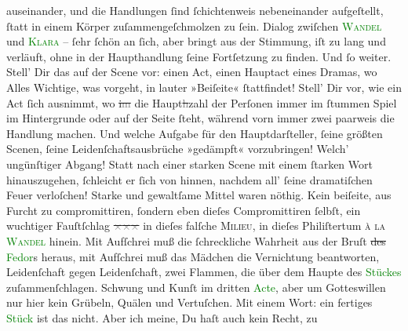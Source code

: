 \documentclass[twoside=false,titlepage=false,open=any, parskip=never, fontsize=12pt, headings=small, chapterprefix=false, appendixprefix=false]{scrbook}
\newcommand{\strikeout}[1]{\sout{#1}}
\newcommand{\pbposition}{\depth}
\newcommand{\pb}{\nobreak\hspace{0pt}\raisebox{-0.1em}{\raisebox{\pbposition}{\textnormal{|}}}\nobreak\hspace{0pt}}
\begin{document}
               auseinander, und die Handlungen ſind ſchichtenweis nebeneinander aufgeſtellt, ſtatt
               in einem Körper zuſammengeſchmolzen zu ſein. Dialog zwiſchen \textsc{\textcolor{green}{Wandel}{}} und \textsc{\textcolor{green}{Klara}{}} – ſehr ſchön an ſich, aber bringt aus der Stimmung, iſt zu lang und verläuft,
               ohne in der Haupthandlung ſeine Fortſetzung zu finden. Und ſo weiter. Stell’ Dir das
               auf der Scene vor: einen Act, einen Hauptact eines Dramas, wo Alles Wichtige, was
               vorgeht, in lauter »Beiſeite« ſtattfindet! Stell’ Dir vor, wie ein Act ſich ausnimmt,
               wo \strikeout{i\textcolor{gray}{m}} die Haupt\strikeout{\textcolor{gray}{h}}zahl der Perſonen immer im ſtummen Spiel im Hintergrunde oder auf der Seite
               ſteht, während vorn immer zwei paarweis {\pb}die
               Handlung machen. Und welche Aufgabe für den Hauptdarſteller, ſeine größten Scenen,
               ſeine Leidenſchaftsausbrüche »gedämpft« vorzubringen! Welch’ ungünſtiger Abgang!
               Statt nach einer starken Scene mit einem ſtarken Wort hinauszugehen, ſchleicht er
               ſich von hinnen, nachdem all’ ſeine dramatiſchen Feuer verloſchen! Starke und
               gewaltſame Mittel waren nöthig. Kein beiſeite, aus Furcht zu compromittiren, ſondern
               eben dieſes Compromittiren ſelbſt, ein wuchtiger Fauſtſchlag \strikeout{\textcolor{gray}{×}\-\textcolor{gray}{×}\-\textcolor{gray}{×}} in dieſes falſche \textsc{Milieu}, in dieſes Philiſtertum \textsc{à la \textcolor{green}{Wandel}{}} hinein. Mit Aufſchrei muß die ſchreckliche Wahrheit aus der Bruſt \strikeout{des}{ }\textcolor{green}{Fedor}{}s heraus, mit Aufſchrei
               muß das Mädchen die Vernichtung beantworten, Leidenſchaft gegen Leidenſchaft, zwei
               Flammen, die über dem Haupte des \textcolor{green}{Stückes}{} zuſammenſchlagen. Schwung und Kunſt im dritten \textcolor{green}{Acte}{}, aber {\pb}um Gotteswillen nur hier kein Grübeln, Quälen und Vertuſchen.\pend
           \pstart
           Mit einem Wort: ein fertiges \textcolor{green}{Stück}{} ist das nicht. Aber ich meine, Du haſt auch kein Recht, zu
\end{document}
